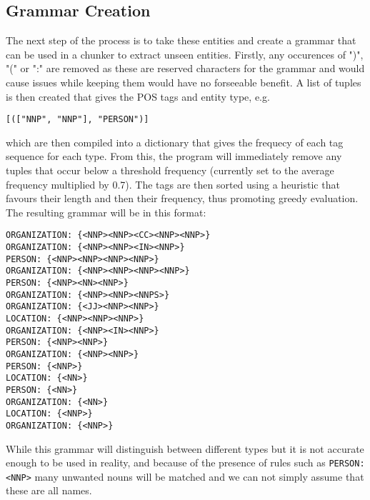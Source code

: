 \documentclass[draft]{article}
\begin{document}
\begin{multicols*}{2}
\section*{Grammar Creation}
The next step of the process is to take these entities and create a grammar that can be used in a chunker \citep{NLPChunker} to extract unseen entities. Firstly, any occurences of ")", "(" or ":" are removed as these are reserved characters for the grammar and would cause issues while keeping them would have no forseeable benefit. A list of tuples is then created that gives the POS tags and entity type, e.g. \begin{verbatim}[(["NNP", "NNP"], "PERSON")]\end{verbatim} which are then compiled into a dictionary that gives the frequecy of each tag sequence for each type. From this, the program will immediately remove any tuples that occur below a threshold frequency (currently set to the average frequency multiplied by 0.7). The tags are then sorted using a heuristic that favours their length and then their frequency, thus promoting greedy evaluation. The resulting grammar will be in this format:
\begin{verbatim}
ORGANIZATION: {<NNP><NNP><CC><NNP><NNP>}
ORGANIZATION: {<NNP><NNP><IN><NNP>}
PERSON: {<NNP><NNP><NNP><NNP>}
ORGANIZATION: {<NNP><NNP><NNP><NNP>}
PERSON: {<NNP><NN><NNP>}
ORGANIZATION: {<NNP><NNP><NNPS>}
ORGANIZATION: {<JJ><NNP><NNP>}
LOCATION: {<NNP><NNP><NNP>}
ORGANIZATION: {<NNP><IN><NNP>}
PERSON: {<NNP><NNP>}
ORGANIZATION: {<NNP><NNP>}
PERSON: {<NNP>}
LOCATION: {<NN>}
PERSON: {<NN>}
ORGANIZATION: {<NN>}
LOCATION: {<NNP>}
ORGANIZATION: {<NNP>}
\end{verbatim}

While this grammar will distinguish between different types but it is not accurate enough to be used in reality, and because of the presence of rules such as \texttt{PERSON: {<NNP>}} many unwanted nouns will be matched and we can not simply assume that these are all names.


\end{multicols*}
\end{document}
